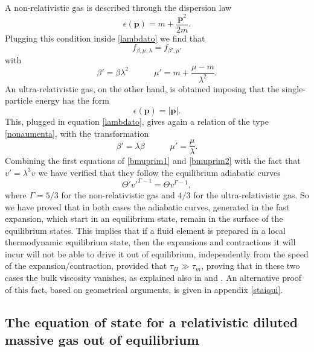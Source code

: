 \documentclass[useAMS,usenatbib,prd,twocolumn,nofootinbib]{revtex4-1}
\newcommand{\vect}[1]{\mathbf{{#1}}}
\newcommand{\spc}{\quad \quad \quad}
\begin{document}
A non-relativistic gas is described through the dispersion law
\begin{equation}
\epsilon (\vect{p}) = m + \dfrac{\vect{p}^2}{2 m} .
\end{equation}
Plugging this condition inside \eqref{lambdato} we find that
\begin{equation}\label{nonaumenta}
f_{\beta,\mu,\lambda} = f_{\beta' , \mu'}
\end{equation}
with
\begin{equation}\label{bmuprim1}
\beta' = \beta \lambda^2  \spc  \mu' = m + \dfrac{\mu -m}{\lambda^2}.
\end{equation}
An ultra-relativistic gas, on the other hand, is obtained imposing that the single-particle energy has the form
\begin{equation}
\epsilon (\vect{p}) = |\vect{p}|.
\end{equation}
This, plugged in equation \eqref{lambdato}, gives again a relation of the type \eqref{nonaumenta}, with the transformation
\begin{equation}\label{bmuprim2}
\beta' = \lambda \beta  \spc  \mu' = \dfrac{\mu}{\lambda}.
\end{equation}
Combining the first equations of \eqref{bmuprim1}  and \eqref{bmuprim2} with the fact that $v'=\lambda^3 v$ we have verified that they follow the equilibrium adiabatic curves
\begin{equation}
\Theta' v'^{\Gamma -1} = \Theta v^{\Gamma-1} ,
\end{equation}
where $\Gamma = 5/3$ for the non-relativistic gas and $4/3$ for the ultra-relativistic gas. So we have proved that in both cases the adiabatic curves, generated in the fast expansion, which start in an equilibrium state, remain in the surface of the equilibrium states. This implies that if a fluid element is prepared in a local thermodynamic equilibrium state, then the expansions and contractions it will incur will not be able to drive it out of equilibrium, independently from the speed of the expansion/contraction, provided that $\tau_H \gg \tau_m$, proving that in these two cases the bulk viscosity vanishes, as explained also in \cite{landau10} and \cite{Tisza_Bulk}. An alternative proof of this fact, based on geometrical arguments, is given in appendix \ref{staiqui}. 

 


\subsection{The equation of state for a relativistic diluted massive gas out of equilibrium}\label{TEOSFARDMGOOE}
\end{document}
